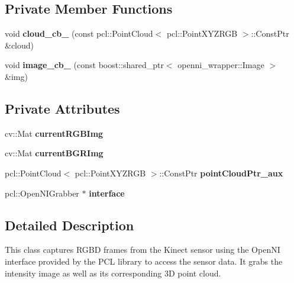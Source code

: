 \subsection*{Private Member Functions}
\begin{DoxyCompactItemize}
\item 
\hypertarget{class_kinect_grabber___open_n_i_a8ea8eb028145dab226c19ddaa0e154d4}{
void {\bfseries cloud\_\-cb\_\-} (const pcl::PointCloud$<$ pcl::PointXYZRGB $>$::ConstPtr \&cloud)}
\label{class_kinect_grabber___open_n_i_a8ea8eb028145dab226c19ddaa0e154d4}

\item 
\hypertarget{class_kinect_grabber___open_n_i_a13c87e25b183ff1d6d891fe771730ec5}{
void {\bfseries image\_\-cb\_\-} (const boost::shared\_\-ptr$<$ openni\_\-wrapper::Image $>$ \&img)}
\label{class_kinect_grabber___open_n_i_a13c87e25b183ff1d6d891fe771730ec5}

\end{DoxyCompactItemize}
\subsection*{Private Attributes}
\begin{DoxyCompactItemize}
\item 
\hypertarget{class_kinect_grabber___open_n_i_af9f188dc0939ceae194e99aec12a9e7b}{
cv::Mat {\bfseries currentRGBImg}}
\label{class_kinect_grabber___open_n_i_af9f188dc0939ceae194e99aec12a9e7b}

\item 
\hypertarget{class_kinect_grabber___open_n_i_a758bee0be65ad86d8f7c24d9fbb68cff}{
cv::Mat {\bfseries currentBGRImg}}
\label{class_kinect_grabber___open_n_i_a758bee0be65ad86d8f7c24d9fbb68cff}

\item 
\hypertarget{class_kinect_grabber___open_n_i_abaf74fe8bba94fab483e8b49745814dc}{
pcl::PointCloud$<$ pcl::PointXYZRGB $>$::ConstPtr {\bfseries pointCloudPtr\_\-aux}}
\label{class_kinect_grabber___open_n_i_abaf74fe8bba94fab483e8b49745814dc}

\item 
\hypertarget{class_kinect_grabber___open_n_i_a3a1075350645cea736211c6c34c136c8}{
pcl::OpenNIGrabber $\ast$ {\bfseries interface}}
\label{class_kinect_grabber___open_n_i_a3a1075350645cea736211c6c34c136c8}

\end{DoxyCompactItemize}


\subsection{Detailed Description}
This class captures RGBD frames from the Kinect sensor using the OpenNI interface provided by the PCL library to access the sensor data. It grabs the intensity image as well as its corresponding 3D point cloud. 

